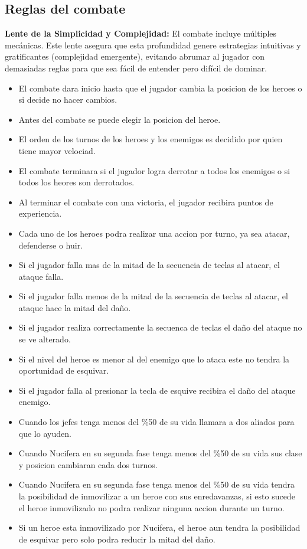 \subsection{Reglas del combate}
\textbf{Lente de la Simplicidad y Complejidad:} El combate incluye múltiples mecánicas. Este lente asegura que esta profundidad genere estrategias intuitivas y gratificantes (complejidad emergente), evitando abrumar al jugador con demasiadas reglas para que sea fácil de entender pero difícil de dominar.
\begin{itemize}
\item El combate dara inicio hasta que el jugador cambia la posicion de los heroes o si decide no hacer cambios. 
\item Antes del combate se puede elegir la posicion del heroe.
\item El orden de los turnos de los heroes y los enemigos es decidido por quien tiene mayor velociad.
\item El combate terminara si el jugador logra derrotar a todos los enemigos o si todos los heores son derrotados.
\item Al terminar el combate con una victoria, el jugador recibira puntos de experiencia.
\item Cada uno de los heroes podra realizar una accion por turno, ya sea atacar, defenderse o huir.
\item Si el jugador falla mas de la mitad de la secuencia de teclas al atacar, el ataque falla.
\item Si el jugador falla menos de la mitad de la secuencia de teclas al atacar, el ataque hace la mitad del daño.
\item Si el jugador realiza correctamente la secuenca de teclas el daño del ataque no se ve alterado.
\item Si el nivel del heroe es menor al del enemigo que lo ataca este no tendra la oportunidad de esquivar.
\item Si el jugador falla al presionar la tecla de esquive recibira el daño del ataque enemigo.
\item Cuando los jefes tenga menos del \%50 de su vida llamara a dos aliados para que lo ayuden.
\item Cuando Nucifera en su segunda fase tenga menos del \%50 de su vida sus clase y posicion cambiaran cada dos turnos.
\item Cuando Nucifera en su segunda fase tenga menos del \%50 de su vida tendra la posibilidad de inmovilizar a un heroe con sus enredavanzas, si esto sucede el heroe inmovilizado no podra realizar ninguna accion durante un turno.
\item Si un heroe esta inmovilizado por Nucifera, el heroe aun tendra la posibilidad de esquivar pero solo podra reducir la mitad del daño.
\end{itemize}

